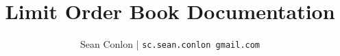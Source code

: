 

\title{Limit Order Book Documentation}

\author{Sean Conlon | \texttt{sc.sean.conlon \@ gmail.com}}









